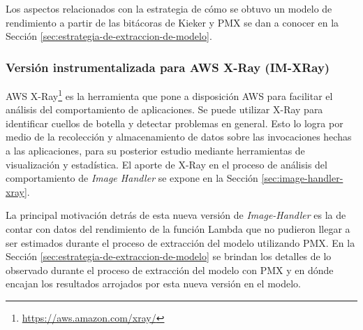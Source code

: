 
%

Los aspectos relacionados con la estrategia de cómo se obtuvo un modelo de rendimiento a partir de las bitácoras de Kieker y PMX se dan a conocer en la Sección \ref{sec:estrategia-de-extraccion-de-modelo}.


\subsubsection{Versión instrumentalizada para AWS X-Ray (IM-XRay)}

AWS X-Ray\footnote{\url{https://aws.amazon.com/xray/}} es la herramienta que pone a disposición AWS para facilitar el análisis del comportamiento de aplicaciones. Se puede utilizar X-Ray para identificar cuellos de botella y detectar problemas en general. Esto lo logra por medio de la recolección y almacenamiento de datos sobre las invocaciones hechas a las aplicaciones, para su posterior estudio mediante herramientas de visualización y estadística. El aporte de X-Ray en el proceso de análisis del comportamiento de \emph{Image Handler} se expone en la Sección \ref{sec:image-handler-xray}.

La principal motivación detrás de esta nueva versión de \emph{Image-Handler} es la de contar con datos del rendimiento de la función Lambda que no pudieron llegar a ser estimados durante el proceso de extracción del modelo utilizando PMX. En la Sección \ref{sec:estrategia-de-extraccion-de-modelo} se brindan los detalles de lo observado durante el proceso de extracción del modelo con PMX y en dónde encajan los resultados arrojados por esta nueva versión en el modelo.
 
